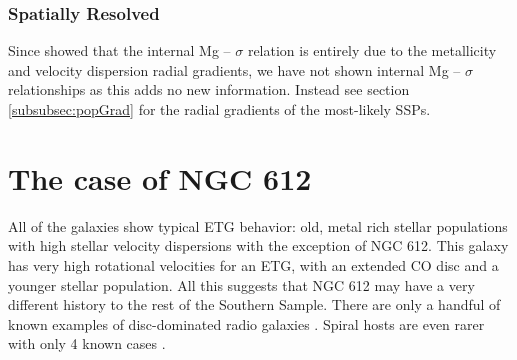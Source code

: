 		\subsubsection{Spatially Resolved}
			Since \citet{Mehlert2003} showed that the internal Mg -- $\sigma$ relation is entirely due to the metallicity and velocity dispersion radial gradients, we have not shown internal Mg -- $\sigma$ relationships as this adds no new information. Instead see section \ref{subsubsec:popGrad} for the radial gradients of the most-likely SSPs.

\section{The case of NGC 612}
	\label{sec:NGC612}
	All of the galaxies show typical ETG behavior: old, metal rich stellar populations with high stellar velocity dispersions with the exception of NGC 612. This galaxy has very high rotational velocities for an ETG, with an extended CO disc and a younger stellar population. All this suggests that NGC 612 may have a very different history to the rest of the Southern Sample. There are only a handful of known examples of disc-dominated radio galaxies \citep[e.g.][]{Morganti2011}. Spiral hosts are even rarer with only 4 known cases \citep{Ledlow1998, Hota2011a, Bagchi2014, Mao2015}.
